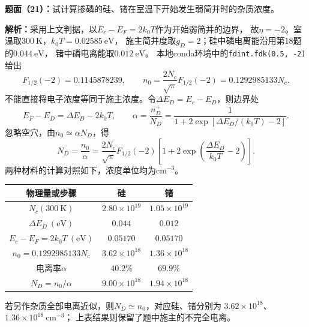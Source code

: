 \begin{problem}
    \textbf{题面（21）：}试计算掺磷的硅、锗在室温下开始发生弱简并时的杂质浓度。

    \textbf{解析：}采用上文判据，以$E_c-E_F=2k_0T$作为开始弱简并的边界，
    故$\eta=-2$。室温取$300\ \mathrm{K}$，$k_0T=0.02585\ \mathrm{eV}$，
    施主简并度取$g_D=2$；硅中磷电离能沿用第18题的$0.044\ \mathrm{eV}$，
    锗中磷电离能取$0.012\ \mathrm{eV}$。
    本地conda环境中的\texttt{fdint.fdk(0.5, -2)}给出
    \[
    F_{1/2}(-2)=0.1145878239,\qquad
    n_0=\frac{2N_c}{\sqrt{\pi}}F_{1/2}(-2)=0.1292985133N_c.
    \]
    不能直接将电子浓度等同于施主浓度。令$\Delta E_D=E_c-E_D$，则边界处
    \[
    E_F-E_D=\Delta E_D-2k_0T,\qquad
    \alpha=\frac{n_D^+}{N_D}
    =\frac{1}{1+2\exp[\Delta E_D/(k_0T)-2]}.
    \]
    忽略空穴，由$n_0\simeq\alpha N_D$，得
    \[
    N_D=\frac{n_0}{\alpha}
    =\frac{2N_c}{\sqrt{\pi}}F_{1/2}(-2)
    \left[1+2\exp\!\left(\frac{\Delta E_D}{k_0T}-2\right)\right].
    \]
    两种材料的计算对照如下，浓度单位均为$\mathrm{cm}^{-3}$。
    \begin{center}
        \begin{tabular}{c c c}
            \hline
            物理量或步骤 & 硅 & 锗 \\
            \hline
            $N_c(300\ \mathrm{K})$ & $2.80\times10^{19}$ & $1.05\times10^{19}$ \\
            $\Delta E_D\ (\mathrm{eV})$ & $0.044$ & $0.012$ \\
            $E_c-E_F=2k_0T\ (\mathrm{eV})$ & $0.05170$ & $0.05170$ \\
            $n_0=0.1292985133N_c$ & $3.62\times10^{18}$ & $1.36\times10^{18}$ \\
            电离率$\alpha$ & $40.2\%$ & $69.9\%$ \\
            $N_D=n_0/\alpha$ & $\boxed{9.00\times10^{18}}$ & $\boxed{1.94\times10^{18}}$ \\
            \hline
        \end{tabular}
    \end{center}
    若另作杂质全部电离近似，则$N_D\simeq n_0$，对应硅、锗分别为
    $3.62\times10^{18}$、$1.36\times10^{18}\ \mathrm{cm}^{-3}$；
    上表结果则保留了题中施主的不完全电离。
\end{problem}

